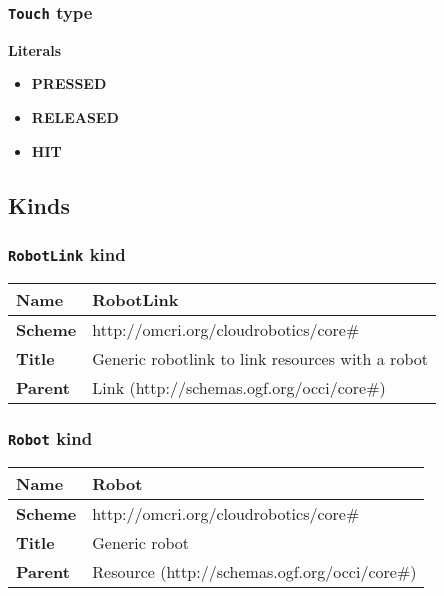 \subsubsection{\texttt{Touch} type}

\textbf{Literals}
\begin{itemize}
\item \textbf{PRESSED} 
\end{itemize}
\begin{itemize}
\item \textbf{RELEASED} 
\end{itemize}
\begin{itemize}
\item \textbf{HIT} 
\end{itemize}

\subsection{Kinds}
\subsubsection{\texttt{RobotLink} kind}
\begin{center}
\begin{tabular}{|l|l|}
  \hline
  \textbf{Name} & RobotLink \\
  \hline  
  \textbf{Scheme} & http://omcri.org/cloudrobotics/core\# \\
  \hline
  \textbf{Title} & Generic robotlink to link resources with a robot \\
  \hline
  \textbf{Parent} & Link (http://schemas.ogf.org/occi/core\#) \\
  \hline
\end{tabular}
\end{center}



\subsubsection{\texttt{Robot} kind}
\begin{center}
\begin{tabular}{|l|l|}
  \hline
  \textbf{Name} & Robot \\
  \hline  
  \textbf{Scheme} & http://omcri.org/cloudrobotics/core\# \\
  \hline
  \textbf{Title} & Generic robot \\
  \hline
  \textbf{Parent} & Resource (http://schemas.ogf.org/occi/core\#) \\
  \hline
\end{tabular}
\end{center}



